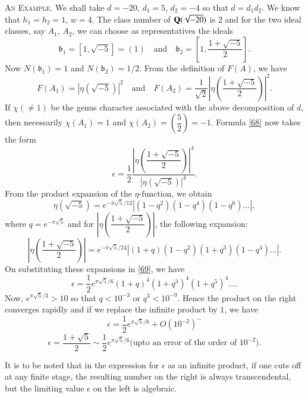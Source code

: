 \textsc{An Example}. We shall take $d=-20$, $d_{1}=5$, $d_{2}=-4$ so
that $d=d_{1}d_{2}$. We know that $h_{1}=h_{2}=1$, $w=4$. The class
number of $\mathbf{Q}(\sqrt{-20})$ is $2$ and for the two ideal classes, say
$A_{1}$, $A_{2}$, we can choose as representatives the ideals
$$
\mathfrak{b}_{1}=[1,\sqrt{-5}]=(1)\quad\text{and}\quad
\mathfrak{b}_{2}=\left[1,\frac{1+\sqrt{-5}}{2}\right].
$$
Now $N(\mathfrak{b}_{1})=1$ and $N(\mathfrak{b}_{2})=1/2$. From the
definition of $F(A)$, we have
$$
F(A_{1})=|\eta(\sqrt{-5})|^{2}\quad\text{and}\quad
F(A_{2})=\frac{1}{\sqrt{2}}\left|\eta\left(\frac{1+\sqrt{-5}}{2}\right)\right|^{2}.
$$
If $\chi(\neq 1)$ be the genus character associated with the above
decomposition of $d$, then necessarily $\chi(A_{1})=1$ and
$\chi(A_{2})=\left(\dfrac{5}{2}\right)=-1$. Formula \eqref{68} now
takes the form 
\begin{equation*}
\epsilon=\frac{1}{2}\frac{\left|\eta\left(\dfrac{1+\sqrt{-5}}{2}\right)\right|^{4}}{|\eta(\sqrt{-5})|^{4}}.\tag{69}\label{69} 
\end{equation*}\pageoriginale
From the product expansion of the $\eta$-function, we obtain
$$
\eta(\sqrt{-5})=e^{-\pi\sqrt{5}/12}|(1-q^{2})(1-q^{4})(1-q^{6})\ldots
|,
$$
where $q=e^{-\pi\sqrt{5}}$ and for
$\left|\eta\left(\dfrac{1+\sqrt{-5}}{2}\right)\right|$, the following
expansion: 
$$
\left|\eta\left(\frac{1+\sqrt{-5}}{2}\right)\right|=e^{-\pi\sqrt{5}/24}|(1+q)(1-q^{2})(1+q^{3})(1-q^{4})\ldots|.
$$
On substituting these expansions in \eqref{69}, we have
$$
\epsilon=\frac{1}{2}e^{\pi\sqrt{5}/6}(1+q)^{4}(1+q^{3})^{4}(1+q^{5})^{4}\ldots.
$$
Now, $e^{\pi\sqrt{5}/3}>10$ so that $q<10^{-3}$ or
$q^{3}<10^{-9}$. Hence the product on the right converges rapidly and
if we replace the infinite product by $1$, we have
$$
\epsilon=\frac{1}{2}e^{\pi\sqrt{5}/6}+O(10^{-2})^{-}
$$
\ie
$$
\epsilon=\frac{1+\sqrt{5}}{2}\sim\frac{1}{2}e^{\pi\sqrt{5}/6}\text{
  (upto an error of the order of $10^{-2}$).}
$$

It is to be noted that in the expression for $\epsilon$ as an infinite
product, if one cuts off at any finite stage, the resulting number on
the right is always transcendental, but the limiting value $\epsilon$
on the left is algebraic.

